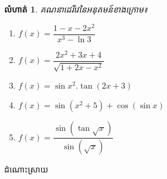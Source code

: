 \documentclass[12pt,fleqn]{book} %
\newtheorem{exercise}{\kml លំហាត់}
\newcommand{\answer}{\begin{center}
\kml \color{magenta} ដំណោះស្រាយ
\end{center}}
\begin{document}
\begin{exercise}
គណនាដេរីវេនៃអនុគមន៍ខាងក្រោម៖
\begin{multicols}{2}
\begin{enumerate}
\item $f(x)=\dfrac{1-x-2x^2}{x^3-\ln 3}$
\item $f(x)=\dfrac{2x^2+3x+4}{\sqrt{1+2x-x^2}}$
\item $f(x)=\sin x^2.\tan (2x+3)$
\item $f(x)=\sin (x^2+5)+\cos (\sin x)$
\item $f(x)=\dfrac{\sin (\tan \sqrt{x})}{\sin (\sqrt{x})}$
\end{enumerate}
\end{multicols}
\end{exercise}
\answer 
\end{document}
